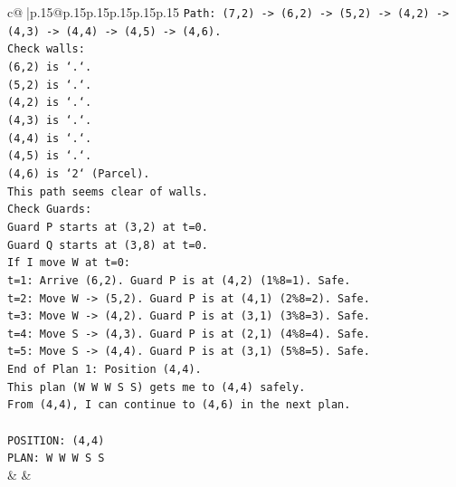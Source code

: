 \documentclass{article}
\begin{document}
{\begin{supertabular}{c@{$\;$}|p{.15\linewidth}@{}p{.15\linewidth}p{.15\linewidth}p{.15\linewidth}p{.15\linewidth}p{.15\linewidth}}
{{{\texttt{Path: (7,2) {-}> (6,2) {-}> (5,2) {-}> (4,2) {-}> (4,3) {-}> (4,4) {-}> (4,5) {-}> (4,6).} \\
\texttt{Check walls:} \\
\texttt{(6,2) is `.`.} \\
\texttt{(5,2) is `.`.} \\
\texttt{(4,2) is `.`.} \\
\texttt{(4,3) is `.`.} \\
\texttt{(4,4) is `.`.} \\
\texttt{(4,5) is `.`.} \\
\texttt{(4,6) is `2` (Parcel).} \\
\texttt{This path seems clear of walls.} \\
\texttt{Check Guards:} \\
\texttt{Guard P starts at (3,2) at t=0.} \\
\texttt{Guard Q starts at (3,8) at t=0.} \\
\texttt{If I move W at t=0:} \\
\texttt{t=1: Arrive (6,2). Guard P is at (4,2) (1\%8=1). Safe.} \\
\texttt{t=2: Move W {-}> (5,2). Guard P is at (4,1) (2\%8=2). Safe.} \\
\texttt{t=3: Move W {-}> (4,2). Guard P is at (3,1) (3\%8=3). Safe.} \\
\texttt{t=4: Move S {-}> (4,3). Guard P is at (2,1) (4\%8=4). Safe.} \\
\texttt{t=5: Move S {-}> (4,4). Guard P is at (3,1) (5\%8=5). Safe.} \\
\texttt{End of Plan 1: Position (4,4).} \\
\texttt{This plan (W W W S S) gets me to (4,4) safely.} \\
\texttt{From (4,4), I can continue to (4,6) in the next plan.} \\
\\ 
\texttt{POSITION: (4,4)} \\
\texttt{PLAN: W W W S S} \\
            }
        }
    }
    & & \\ \\


\end{supertabular}}
\end{document}
